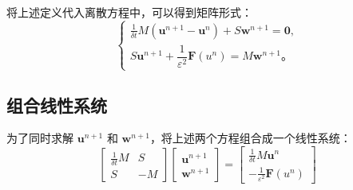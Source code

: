 \documentclass[12pt,a4paper]{article}
\begin{document}
	将上述定义代入离散方程中，可以得到矩阵形式：
	\begin{equation}
		\begin{cases}
			\frac{1}{\delta t} M (\mathbf{u}^{n+1} - \mathbf{u}^n) + S \mathbf{w}^{n+1} = \mathbf{0}, \\
			S \mathbf{u}^{n+1} + \dfrac{1}{\varepsilon^2} \mathbf{F}(u^n) = M \mathbf{w}^{n+1}。
		\end{cases}
	\end{equation}
	
	\subsection{组合线性系统}
	
	为了同时求解 \( \mathbf{u}^{n+1} \) 和 \( \mathbf{w}^{n+1} \)，将上述两个方程组合成一个线性系统：
	\begin{equation}
		\begin{bmatrix}
			\frac{1}{\delta t} M & S \\
			S & -M
		\end{bmatrix}
		\begin{bmatrix}
			\mathbf{u}^{n+1} \\
			\mathbf{w}^{n+1}
		\end{bmatrix}
		=
		\begin{bmatrix}
			\frac{1}{\delta t} M \mathbf{u}^n \\
			- \frac{1}{\varepsilon^2} \mathbf{F}(u^n)
		\end{bmatrix}
	\end{equation}
	
\end{document}
